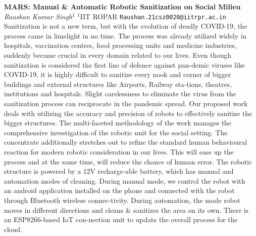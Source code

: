 
    \begin{conf-abstract}[]
        {\textbf{MARS: Manual \& Automatic Robotic Sanitization on Social Milieu }}
        {\textit{Raushan  Kumar Singh$^{1}$}}
        {$^{1}$IIT ROPAR}
        {\texttt{Raushan.21csz0020@iitrpr.ac.in}}
        {Sanitization is not a new term, but with the evolution of deadly COVID-19, the process came in limelight in no time. The process was already utilized widely in hospitals, vaccination centres, food processing units and medicine industries, suddenly became crucial in every domain related to our lives. Even though sanitization is considered the first line of defence against pan-demic viruses like COVID-19, it is highly difficult to sanitize every nook and corner of bigger buildings and external structures like Airports, Railway sta-tions, theatres, institutions and hospitals. Slight carelessness to eliminate the virus from the sanitization process can reciprocate in the pandemic spread. Our proposed work deals with utilizing the accuracy and precision of robots to effectively sanitize the bigger structures. The multi-faceted methodology of the work manages the comprehensive investigation of the robotic unit for the social setting. The concentrate additionally stretches out to refine the standard human behavioural reaction for modern robotic consideration in our lives. This will ease up the process and at the same time, will reduce the chance of human error. The robotic structure is powered by a 12V recharge-able battery, which has manual and automation modes of cleaning. During manual mode, we control the robot with an android application installed on the phone and connected with the robot through Bluetooth wireless connec-tivity. During automation, the mode robot moves in different directions and cleans \& sanitizes the area on its own. There is an ESP8266-based IoT con-nection unit to update the overall process for the cloud. }
    \end{conf-abstract}
        